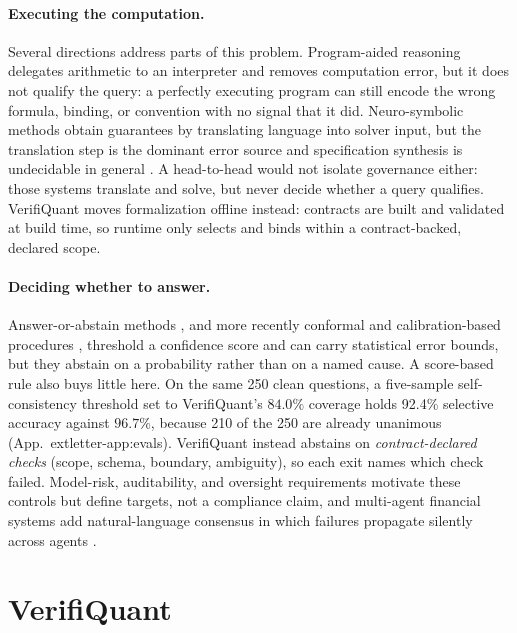 \documentclass[sigconf]{acmart}
\newif\ifarxiv
\newcommand{\extref}[1]{App.~\ifarxiv\ref{#1}\else\csname extletter-#1\endcsname\fi}
\newcommand{\scSelAccTight}{92.4\%}  %
\newcommand{\scUnanimous}{210}       %
\begin{document}
\paragraph{Executing the computation.}
Several directions address parts of this problem. Program-aided reasoning \cite{gao2023pal,chen2023pot} delegates arithmetic to an interpreter and removes computation error, but it does not qualify the query: a perfectly executing program can still encode the wrong formula, binding, or convention with no signal that it did. Neuro-symbolic methods \cite{pan2023logiclm,olausson2023linc,ye2023satlm} obtain guarantees by translating language into solver input, but the translation step is the dominant error source and specification synthesis is undecidable in general \cite{zhou2026formaljudge}. A head-to-head would not isolate governance either: those systems translate and solve, but never decide whether a query qualifies. VerifiQuant moves formalization offline instead: contracts are built and validated at build time, so runtime only selects and binds within a contract-backed, declared scope.

\paragraph{Deciding whether to answer.}
Answer-or-abstain methods \cite{elyaniv2010foundations,geifman2017selective}, and more recently conformal and calibration-based procedures \cite{quach2024conformal,kadavath2022language}, threshold a confidence score and can carry statistical error bounds, but they abstain on a probability rather than on a named cause. A score-based rule also buys little here. On the same 250 clean questions, a five-sample self-consistency threshold set to VerifiQuant's $84.0\%$ coverage holds \scSelAccTight{} selective accuracy against $96.7\%$, because \scUnanimous{} of the 250 are already unanimous (\extref{app:evals}). VerifiQuant instead abstains on \emph{contract-declared checks} (scope, schema, boundary, ambiguity), so each exit names which check failed. Model-risk, auditability, and oversight requirements \cite{fed2026sr262,pra2023ss123,euaiact2024,finra2020ai} motivate these controls but define targets, not a compliance claim, and multi-agent financial systems \cite{kundu2025multiagent} add natural-language consensus in which failures propagate silently across agents \cite{cemri2025mas}.

\section{VerifiQuant}\label{sec:v2method}
\end{document}

